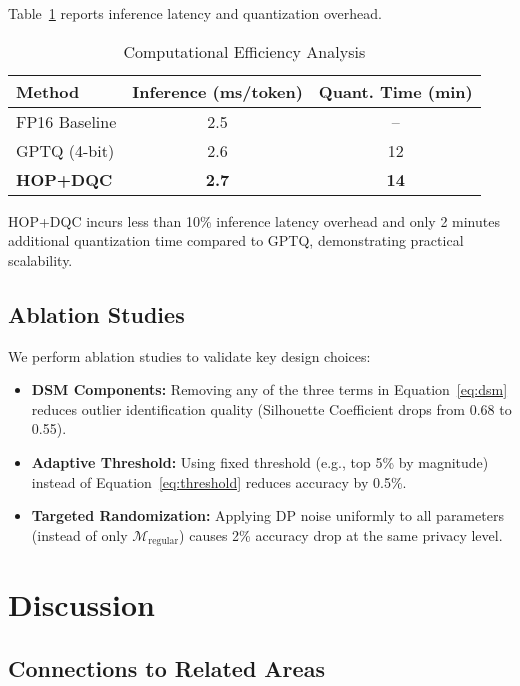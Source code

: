 \documentclass[letterpaper,twocolumn,10pt]{article}
\begin{document}
Table~\ref{tab:efficiency} reports inference latency and quantization overhead.

\begin{table}[t]
\centering
\caption{Computational Efficiency Analysis}
\label{tab:efficiency}
\small
\begin{tabular}{@{}lcc@{}}
\toprule
\textbf{Method} & \textbf{Inference (ms/token)} & \textbf{Quant. Time (min)} \\
\midrule
FP16 Baseline & 2.5 & -- \\
GPTQ (4-bit) & 2.6 & 12 \\
\textbf{HOP+DQC} & \textbf{2.7} & \textbf{14} \\
\bottomrule
\end{tabular}
\end{table}

HOP+DQC incurs less than 10\% inference latency overhead and only 2 minutes additional quantization time compared to GPTQ, demonstrating practical scalability.

\subsection{Ablation Studies}

We perform ablation studies to validate key design choices:
\begin{itemize}
\item \textbf{DSM Components:} Removing any of the three terms in Equation~\ref{eq:dsm} reduces outlier identification quality (Silhouette Coefficient drops from 0.68 to 0.55).
\item \textbf{Adaptive Threshold:} Using fixed threshold (e.g., top 5\% by magnitude) instead of Equation~\ref{eq:threshold} reduces accuracy by 0.5\%.
\item \textbf{Targeted Randomization:} Applying DP noise uniformly to all parameters (instead of only $\mathcal{M}_{\text{regular}}$) causes 2\% accuracy drop at the same privacy level.
\end{itemize}

\section{Discussion}
\label{sec:discussion}

\subsection{Connections to Related Areas}
\end{document}
